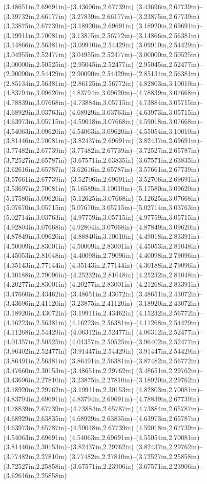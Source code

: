 (3.48651in,2.69691in)--(3.43696in,2.67739in) (3.43696in,2.67739in)--(3.39732in,2.66177in) (3.27839in,2.66177in)--(3.23875in,2.67739in) (3.23875in,2.67739in)--(3.18920in,2.69691in) (3.18920in,2.69691in)--(3.19911in,2.70081in) (3.13875in,2.56772in)--(3.14866in,2.56381in) (3.14866in,2.56381in)--(3.09910in,2.54429in) (3.09910in,2.54429in)--(3.04955in,2.52477in) (3.04955in,2.52477in)--(3.00000in,2.50525in) (3.00000in,2.50525in)--(2.95045in,2.52477in) (2.95045in,2.52477in)--(2.90090in,2.54429in) (2.90090in,2.54429in)--(2.85134in,2.56381in) (2.85134in,2.56381in)--(2.86125in,2.56772in) (4.82803in,3.10010in)--(4.83794in,3.09620in) (4.83794in,3.09620in)--(4.78839in,3.07668in) (4.78839in,3.07668in)--(4.73884in,3.05715in) (4.73884in,3.05715in)--(4.68929in,3.03763in) (4.68929in,3.03763in)--(4.63973in,3.05715in) (4.63973in,3.05715in)--(4.59018in,3.07668in) (4.59018in,3.07668in)--(4.54063in,3.09620in) (4.54063in,3.09620in)--(4.55054in,3.10010in) (3.81446in,2.70081in)--(3.82437in,2.69691in) (3.82437in,2.69691in)--(3.77482in,2.67739in) (3.77482in,2.67739in)--(3.72527in,2.65787in) (3.72527in,2.65787in)--(3.67571in,2.63835in) (3.67571in,2.63835in)--(3.62616in,2.65787in) (3.62616in,2.65787in)--(3.57661in,2.67739in) (3.57661in,2.67739in)--(3.52706in,2.69691in) (3.52706in,2.69691in)--(3.53697in,2.70081in) (5.16589in,3.10010in)--(5.17580in,3.09620in) (5.17580in,3.09620in)--(5.12625in,3.07668in) (5.12625in,3.07668in)--(5.07670in,3.05715in) (5.07670in,3.05715in)--(5.02714in,3.03763in) (5.02714in,3.03763in)--(4.97759in,3.05715in) (4.97759in,3.05715in)--(4.92804in,3.07668in) (4.92804in,3.07668in)--(4.87849in,3.09620in) (4.87849in,3.09620in)--(4.88840in,3.10010in) (4.49018in,2.83391in)--(4.50009in,2.83001in) (4.50009in,2.83001in)--(4.45053in,2.81048in) (4.45053in,2.81048in)--(4.40098in,2.79096in) (4.40098in,2.79096in)--(4.35143in,2.77144in) (4.35143in,2.77144in)--(4.30188in,2.79096in) (4.30188in,2.79096in)--(4.25232in,2.81048in) (4.25232in,2.81048in)--(4.20277in,2.83001in) (4.20277in,2.83001in)--(4.21268in,2.83391in) (3.47660in,2.43462in)--(3.48651in,2.43072in) (3.48651in,2.43072in)--(3.43696in,2.41120in) (3.23875in,2.41120in)--(3.18920in,2.43072in) (3.18920in,2.43072in)--(3.19911in,2.43462in) (4.15232in,2.56772in)--(4.16223in,2.56381in) (4.16223in,2.56381in)--(4.11268in,2.54429in) (4.11268in,2.54429in)--(4.06312in,2.52477in) (4.06312in,2.52477in)--(4.01357in,2.50525in) (4.01357in,2.50525in)--(3.96402in,2.52477in) (3.96402in,2.52477in)--(3.91447in,2.54429in) (3.91447in,2.54429in)--(3.86491in,2.56381in) (3.86491in,2.56381in)--(3.87482in,2.56772in) (3.47660in,2.30153in)--(3.48651in,2.29762in) (3.48651in,2.29762in)--(3.43696in,2.27810in) (3.23875in,2.27810in)--(3.18920in,2.29762in) (3.18920in,2.29762in)--(3.19911in,2.30153in) (4.82803in,2.70081in)--(4.83794in,2.69691in) (4.83794in,2.69691in)--(4.78839in,2.67739in) (4.78839in,2.67739in)--(4.73884in,2.65787in) (4.73884in,2.65787in)--(4.68929in,2.63835in) (4.68929in,2.63835in)--(4.63973in,2.65787in) (4.63973in,2.65787in)--(4.59018in,2.67739in) (4.59018in,2.67739in)--(4.54063in,2.69691in) (4.54063in,2.69691in)--(4.55054in,2.70081in) (3.81446in,2.30153in)--(3.82437in,2.29762in) (3.82437in,2.29762in)--(3.77482in,2.27810in) (3.77482in,2.27810in)--(3.72527in,2.25858in) (3.72527in,2.25858in)--(3.67571in,2.23906in) (3.67571in,2.23906in)--(3.62616in,2.25858in) 